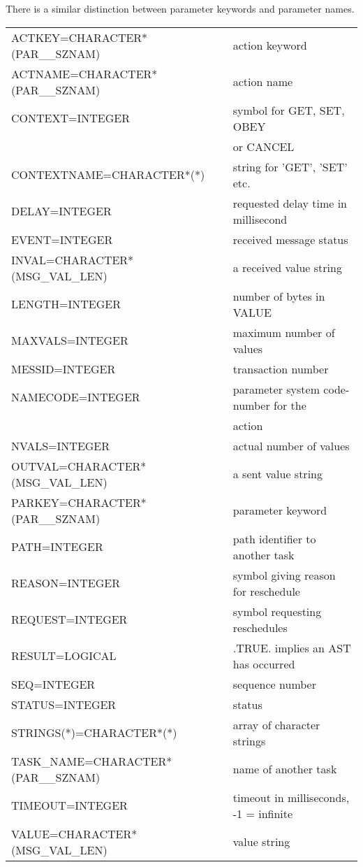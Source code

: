 There is a similar distinction between parameter keywords and parameter
names.
\small
\begin{center}
\begin{tabular}{ll}
ACTKEY=CHARACTER*(PAR\_\_SZNAM)   &  action keyword \\
ACTNAME=CHARACTER*(PAR\_\_SZNAM)  &  action name \\
CONTEXT=INTEGER                  &  symbol for GET, SET, OBEY \\
                                 &  or CANCEL \\
CONTEXTNAME=CHARACTER*(*)        &  string for 'GET', 'SET' etc. \\
DELAY=INTEGER                    &  requested delay time in millisecond \\
EVENT=INTEGER                    &  received message status \\
INVAL=CHARACTER*(MSG\_VAL\_LEN)  &  a received value string \\
LENGTH=INTEGER                   &  number of bytes in VALUE \\
MAXVALS=INTEGER                  &  maximum number of values \\
MESSID=INTEGER                   &  transaction number \\
NAMECODE=INTEGER                 &  parameter system code-number for the \\
                                 &  action \\
NVALS=INTEGER                    &  actual number of values \\
OUTVAL=CHARACTER*(MSG\_VAL\_LEN) &  a sent value string \\
PARKEY=CHARACTER*(PAR\_\_SZNAM)   &  parameter keyword \\
PATH=INTEGER                     &  path identifier to another task \\
REASON=INTEGER                   &  symbol giving reason for reschedule \\
REQUEST=INTEGER                  &  symbol requesting reschedules \\
RESULT=LOGICAL                   &  .TRUE. implies an AST has occurred \\
SEQ=INTEGER                      &  sequence number \\
STATUS=INTEGER                   &  status \\
STRINGS(*)=CHARACTER*(*)         &  array of character strings \\
TASK\_NAME=CHARACTER*(PAR\_\_SZNAM) & name of another task \\
TIMEOUT=INTEGER                  &  timeout in milliseconds, -1 = infinite \\
VALUE=CHARACTER*(MSG\_VAL\_LEN)  &  value string \\
\end{tabular}
\end{center}
\normalsize

